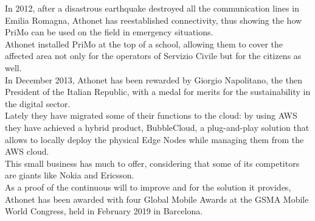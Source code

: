 	In 2012, after a disastrous earthquake destroyed all the communication lines in Emilia Romagna, Athonet has reestablished connectivity, thus showing the how PriMo can be used on the field in emergency situations.\\
	Athonet installed PriMo at the top of a school, allowing them to cover the affected area not only for the operators of Servizio Civile but for the citizens as well.\\
	In December 2013, Athonet has been rewarded by Giorgio Napolitano, the then President of the Italian Republic, with a medal for merits for the sustainability in the digital sector\cite{athonet_presidente}.\\
	Lately they have migrated some of their functions to the cloud: by using AWS they have achieved a hybrid product, BubbleCloud, a plug-and-play solution that allows to locally deploy the physical Edge Nodes while managing them from the AWS cloud.\\
	This small business has much to offer, considering that some of its competitors are giants like Nokia and Ericsson.\\
	As a proof of the continuous will to improve and for the solution it provides, Athonet has been awarded with four Global Mobile Awards at the GSMA Mobile World Congress, held in February 2019 in Barcelona\cite{athonet_premi}.

